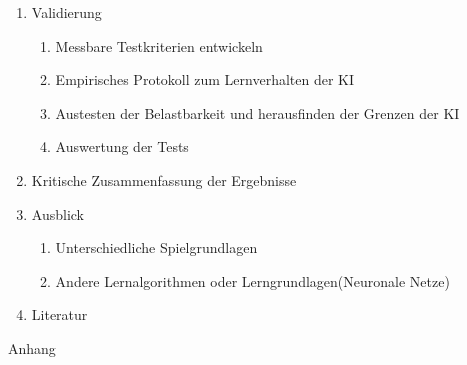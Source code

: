 \documentclass[12pt,a4paper]{article}
\begin{document}
\begin{enumerate}
	\item Validierung
	\begin{enumerate}
		\item Messbare Testkriterien entwickeln
		\item Empirisches Protokoll zum Lernverhalten der KI
		\item Austesten der Belastbarkeit und herausfinden der Grenzen der KI
		\item Auswertung der Tests
	\end{enumerate}
	
	\item Kritische Zusammenfassung der Ergebnisse

	\item Ausblick
	\begin{enumerate}
		\item Unterschiedliche Spielgrundlagen
		\item Andere Lernalgorithmen oder Lerngrundlagen(Neuronale Netze)
	\end{enumerate}			
	
	\item Literatur	
\end{enumerate}
Anhang


\nocite{*}
\printbibliography
\end{document}
